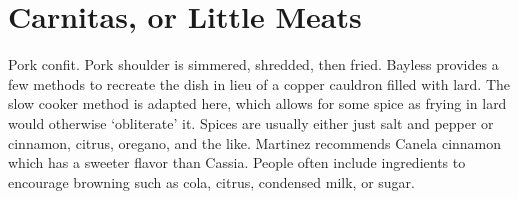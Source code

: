 \section[Carnitas]{Carnitas, or Little Meats}%


\begin{recipestats}[
	servings=8,
	preptime=30~\minute,
	bakingtime=8~\hour,
    source=Mike \& Jane,
    original=Rick~\cite{baylessCarnitas} \& Rick~\cite{martinezCarnitas},
]
\end{recipestats}


\begin{recipeabstract}
    Pork confit.
    Pork shoulder is simmered, shredded, then fried.
    Bayless provides a few methods to recreate the dish in lieu of a copper cauldron filled with lard.
    The slow cooker method is adapted here, which allows for some spice as frying in lard would otherwise `obliterate' it.
    Spices are usually either just salt and pepper or cinnamon, citrus, oregano, and the like.
    Martinez recommends Canela cinnamon which has a sweeter flavor than Cassia.
    People often include ingredients to encourage browning such as cola, citrus, condensed milk, or sugar.
\end{recipeabstract}


\begin{ingredientcolumns}
    \begin{ingredientblock}[sachet]
        \\
        \\
        \\
        \\
        \\
        \\
        \\
    \end{ingredientblock}
    \begin{ingredientblock}[pork]
        \\
        \\
        \\
        \\
        \\
    \end{ingredientblock}
\end{ingredientcolumns}


